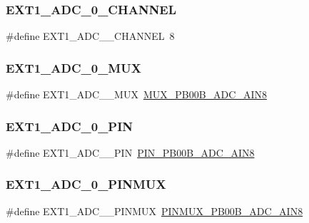 \subsubsection{\texorpdfstring{EXT1\_ADC\_0\_CHANNEL}{EXT1\_ADC\_0\_CHANNEL}}
{\footnotesize\ttfamily \#define E\+X\+T1\+\_\+\+A\+D\+C\+\_\+\_\+\+C\+H\+A\+N\+N\+EL~8}

\mbox{\label{group__samd21__xplained__pro__features__group_gabdc6ba9937a1050b8a40f8928d95fbc4}} 
\subsubsection{\texorpdfstring{EXT1\_ADC\_0\_MUX}{EXT1\_ADC\_0\_MUX}}
{\footnotesize\ttfamily \#define E\+X\+T1\+\_\+\+A\+D\+C\+\_\+\_\+\+M\+UX~\mbox{\hyperlink{pio_2samd21j18a_8h_a71de17af729c0317dacad0605aed38b7}{M\+U\+X\+\_\+\+P\+B00\+B\+\_\+\+A\+D\+C\+\_\+\+A\+I\+N8}}}

\mbox{\label{group__samd21__xplained__pro__features__group_ga646da6c87a60fb8f8961f877ce858f43}} 
\subsubsection{\texorpdfstring{EXT1\_ADC\_0\_PIN}{EXT1\_ADC\_0\_PIN}}
{\footnotesize\ttfamily \#define E\+X\+T1\+\_\+\+A\+D\+C\+\_\+\_\+\+P\+IN~\mbox{\hyperlink{pio_2samd21j18a_8h_a908a9cac08dea9a27ed599cc49b6a93e}{P\+I\+N\+\_\+\+P\+B00\+B\+\_\+\+A\+D\+C\+\_\+\+A\+I\+N8}}}

\mbox{\label{group__samd21__xplained__pro__features__group_ga1724086d943789b79674a86857cb0fae}} 
\subsubsection{\texorpdfstring{EXT1\_ADC\_0\_PINMUX}{EXT1\_ADC\_0\_PINMUX}}
{\footnotesize\ttfamily \#define E\+X\+T1\+\_\+\+A\+D\+C\+\_\+\_\+\+P\+I\+N\+M\+UX~\mbox{\hyperlink{pio_2samd21j18a_8h_ac5281f3a452f510af8a361c29b71a9f4}{P\+I\+N\+M\+U\+X\+\_\+\+P\+B00\+B\+\_\+\+A\+D\+C\+\_\+\+A\+I\+N8}}}

